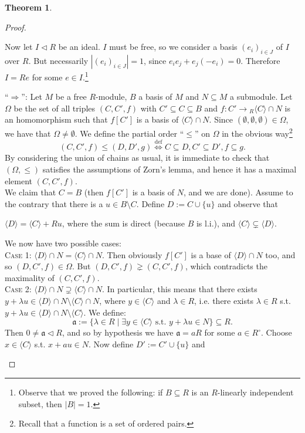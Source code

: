 \documentclass[12pt,a4paper]{report}
\theoremstyle{definition}
\newtheorem{theorem}{Theorem}[chapter] %
\theoremstyle{num.custom-title}
\DeclareMathOperator{\imp}{\Rightarrow}
\DeclareMathOperator{\sm}{\setminus}
\DeclareMathOperator{\sse}{\subseteq}
\renewcommand{\iff}{\Leftrightarrow}
\begin{document}
\begin{theorem}
\begin{proof}
\begin{enumerate}
Now let $I \lhd R$ be an ideal. $I$ must be free, so we consider a basis $(e_i)_{i \in J}$ of $I$ over $R$. But necessarily $|(e_i)_{i \in J}|=1$, since $e_i e_j + e_j (-e_i) = 0$. Therefore $I = R e$ for some $e \in I$.\footnote{Observe that we proved the following: if $B \sse R$ is an $R$-linearly independent subset, then $|B|=1$.}

``$\imp$'': Let $M$ be a free $R$-module, $B$ a basis of $M$ and $N \sse M$ a submodule. Let $\Omega$ be the set of all triples $(C,C',f)$ with $C' \sse C \sse B$ and $f: C' \to {}_R \langle C \rangle \cap N$ is an homomorphism such that $f[C']$ is a basis of $\langle C \rangle \cap N$. Since $(\emptyset, \emptyset, \emptyset) \in \Omega$, we have that $\Omega \neq \emptyset$. We define the partial order ``$\leq$'' on $\Omega$ in the obvious way\footnote{Recall that a function is a set of ordered pairs.}
\[
(C,C',f) \leq (D,D',g) \stackrel{\text{def}}{\iff} C \sse D, C' \sse D', f \sse g.
\]
By considering the union of chains as usual, it is immediate to check that $(\Omega,\leq)$ satisfies the assumptions of Zorn's lemma, and hence it has a maximal element $(C,C',f)$.\\
We claim that $C=B$ (then $f[C']$ is a basis of $N$, and we are done). Assume to the contrary that there is a $u \in B \sm C$. Define $D := C \cup \{u\}$ and observe that
\begin{center}
$\langle D \rangle = \langle C \rangle + Ru$, where the sum is direct (because $B$ is l.i.), and $\langle C \rangle \subsetneq \langle D \rangle$.
\end{center}
We now have two possible cases:\\
\textsc{Case 1:} $\langle D \rangle \cap N = \langle C \rangle \cap N$. Then obviously $f[C']$ is a base of $\langle D \rangle \cap N$ too, and so $(D,C',f) \in \Omega$. But $(D,C',f) \gneq (C,C',f)$, which contradicts the maximality of $(C,C',f)$.\\
\textsc{Case 2:} $\langle D \rangle \cap N \supsetneq \langle C \rangle \cap N$. In particular, this means that there exists $y+\lambda u \in \langle D \rangle \cap N \sm \langle C \rangle \cap N$, where $y \in \langle C \rangle$ and $\lambda \in R$, i.e. there exists $\lambda \in R$ s.t. $y+\lambda u \in \langle D \rangle \cap N \sm \langle C \rangle$. We define:
\[
\mathfrak{a} := \{\lambda \in R \mid \exists y \in \langle C \rangle \text{ s.t. } y + \lambda u \in N\} \sse R.
\]
Then $0 \neq \mathfrak{a} \lhd R$, and so by hypothesis we have $\mathfrak{a} = aR$ for some $a \in R^\circ$. Choose $x \in \langle C \rangle$ s.t. $x + au \in N$. Now define $D' := C' \cup \{u\}$ and

\end{enumerate}
\end{proof}
\end{theorem}
\end{document}
